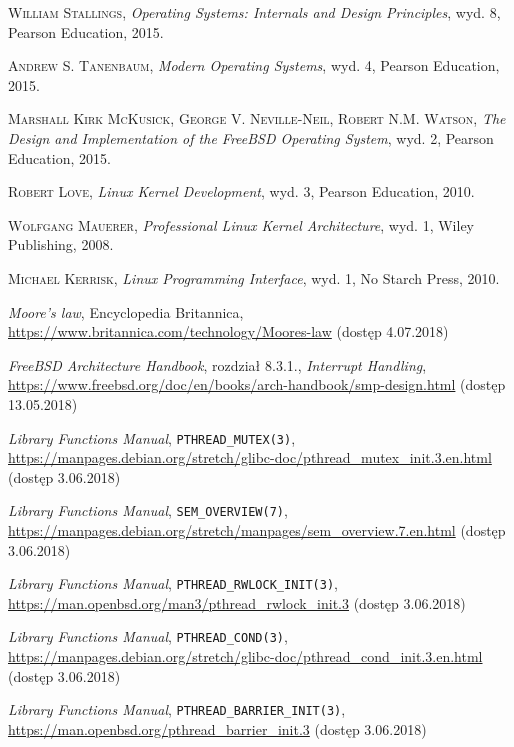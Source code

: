 \documentclass[shortabstract]{iithesis}
\theoremstyle{definition} \newtheorem*{definition}{Definicja}
\theoremstyle{definition} \newtheorem*{example}{Przykład}
\theoremstyle{definition} \newtheorem*{remark}{Uwaga}
\begin{document}
\begin{thebibliography}{99}

\textsc{William Stallings},
\textit{Operating Systems: Internals and Design Principles},
wyd. 8, Pearson Education, 2015.

\textsc{Andrew S. Tanenbaum},
\textit{Modern Operating Systems},
wyd. 4, Pearson Education, 2015.

\textsc{Marshall Kirk McKusick, George V. Neville-Neil, Robert N.M. Watson},
\textit{The Design and Implementation of the FreeBSD Operating System},
wyd. 2, Pearson Education, 2015.

\textsc{Robert Love},
\textit{Linux Kernel Development},
wyd. 3, Pearson Education, 2010.

\textsc{Wolfgang Mauerer},
\textit{Professional Linux Kernel Architecture},
wyd. 1, Wiley Publishing, 2008.

\textsc{Michael Kerrisk},
\textit{Linux Programming Interface},
wyd. 1, No Starch Press, 2010.

 \textit{Moore's law}, Encyclopedia Britannica,
\url{https://www.britannica.com/technology/Moores-law} (dostęp 4.07.2018)

 \textit{FreeBSD Architecture Handbook},
rozdział 8.3.1., \textit{Interrupt Handling},
\url{https://www.freebsd.org/doc/en/books/arch-handbook/smp-design.html} (dostęp 13.05.2018)

 \textit{Library Functions Manual}, \texttt{PTHREAD\_MUTEX(3)},
\url{https://manpages.debian.org/stretch/glibc-doc/pthread_mutex_init.3.en.html} (dostęp 3.06.2018)

 \textit{Library Functions Manual}, \texttt{SEM\_OVERVIEW(7)},
\url{https://manpages.debian.org/stretch/manpages/sem_overview.7.en.html} (dostęp 3.06.2018)

 \textit{Library Functions Manual}, \texttt{PTHREAD\_RWLOCK\_INIT(3)},
\url{https://man.openbsd.org/man3/pthread_rwlock_init.3} (dostęp 3.06.2018)

 \textit{Library Functions Manual}, \texttt{PTHREAD\_COND(3)},
\url{https://manpages.debian.org/stretch/glibc-doc/pthread_cond_init.3.en.html} (dostęp 3.06.2018)

 \textit{Library Functions Manual}, \texttt{PTHREAD\_BARRIER\_INIT(3)},
\url{https://man.openbsd.org/pthread_barrier_init.3} (dostęp 3.06.2018)


\end{thebibliography}
\end{document}
